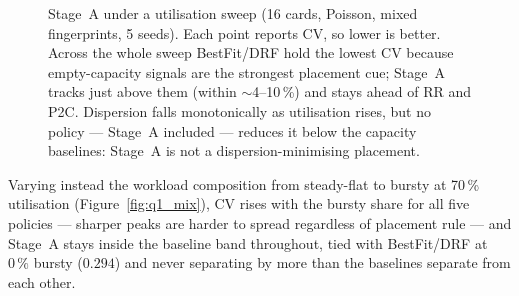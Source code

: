 \documentclass[letterpaper,twocolumn,10pt]{article}
\begin{document}
\begin{figure}[t]
\centering
{}
\caption{Stage~A under a utilisation sweep (16 cards, Poisson, mixed fingerprints, 5 seeds). Each point reports CV, so lower is better. Across the whole sweep BestFit/DRF hold the lowest CV because empty-capacity signals are the strongest placement cue; Stage~A tracks just above them (within $\sim$4--10\,\%) and stays ahead of RR and P2C. Dispersion falls monotonically as utilisation rises, but no policy --- Stage~A included --- reduces it below the capacity baselines: Stage~A is not a dispersion-minimising placement.}
\label{fig:q1_util}
\end{figure}

Varying instead the workload composition from steady-flat to bursty at 70\,\% utilisation (Figure~\ref{fig:q1_mix}), CV rises with the bursty share for all five policies --- sharper peaks are harder to spread regardless of placement rule --- and Stage~A stays inside the baseline band throughout, tied with BestFit/DRF at $0\,\%$ bursty ($0.294$) and never separating by more than the baselines separate from each other.
\end{document}
